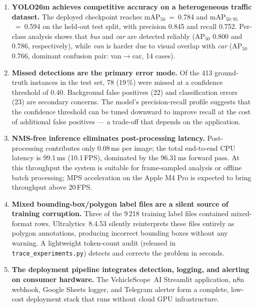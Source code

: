 \begin{enumerate}

  \item \textbf{YOLO26m achieves competitive accuracy on a heterogeneous
    traffic dataset.}
    The deployed checkpoint reaches mAP$_{50}$~=~0.784 and
    mAP$_{50:95}$~=~0.594 on the held-out test split, with precision
    0.845 and recall 0.752.
    Per-class analysis shows that \textit{bus} and \textit{car} are
    detected reliably (AP$_{50}$ 0.800 and 0.786, respectively), while
    \textit{van} is harder due to visual overlap with \textit{car}
    (AP$_{50}$ 0.766, dominant confusion pair: van$\rightarrow$car,
    14 cases).

  \item \textbf{Missed detections are the primary error mode.}
    Of the 413 ground-truth instances in the test set, 78 (19\,\%) were
    missed at a confidence threshold of 0.40.
    Background false positives (22) and classification errors (23) are
    secondary concerns.
    The model's precision-recall profile suggests that the confidence
    threshold can be tuned downward to improve recall at the cost of
    additional false positives — a trade-off that depends on the
    application.

  \item \textbf{NMS-free inference eliminates post-processing latency.}
    Post-processing contributes only 0.08\,ms per image; the total
    end-to-end CPU latency is 99.1\,ms (10.1\,FPS), dominated by the
    96.31\,ms forward pass.
    At this throughput the system is suitable for frame-sampled analysis
    or offline batch processing; MPS acceleration on the Apple M4 Pro is
    expected to bring throughput above 20\,FPS.

  \item \textbf{Mixed bounding-box/polygon label files are a silent
    source of training corruption.}
    Three of the 9\,218 training label files contained mixed-format rows.
    Ultralytics~8.4.53 silently reinterprets these files entirely as
    polygon annotations, producing incorrect bounding boxes without any
    warning.
    A lightweight token-count audit (released in
    \texttt{trace\_experiments.py}) detects and corrects the problem in
    seconds.

  \item \textbf{The deployment pipeline integrates detection, logging, and
    alerting on consumer hardware.}
    The VehicleScope~AI Streamlit application, n8n webhook, Google Sheets
    logger, and Telegram alerter form a complete, low-cost deployment
    stack that runs without cloud GPU infrastructure.

\end{enumerate}

